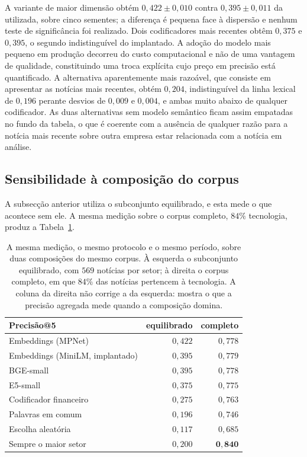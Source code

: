A variante de maior dimensão obtém $0{,}422 \pm 0{,}010$ contra $0{,}395 \pm 0{,}011$ da utilizada,
sobre cinco sementes; a diferença é pequena face à dispersão e nenhum teste de significância foi
realizado. Dois codificadores mais recentes obtêm $0{,}375$ e $0{,}395$, o segundo indistinguível do
implantado. A adoção do modelo
mais pequeno em produção decorreu do custo computacional e não de uma vantagem de qualidade,
constituindo uma troca explícita cujo preço em precisão está quantificado. A alternativa aparentemente mais
razoável, que consiste em apresentar as notícias mais recentes, obtém $0{,}204$, indistinguível da
linha lexical de $0{,}196$ perante desvios de $0{,}009$ e $0{,}004$, e ambas muito abaixo de
qualquer codificador. As duas alternativas sem modelo semântico ficam assim empatadas no fundo da
tabela, o que é coerente com a ausência de qualquer razão para a notícia mais recente sobre outra
empresa estar relacionada com a notícia em análise.

\subsection{Sensibilidade à composição do corpus}
\label{sec:av_composicao}

A subsecção anterior utiliza o subconjunto equilibrado, e esta mede o que acontece sem ele. A
mesma medição sobre o corpus completo, $84\%$ tecnologia, produz a
Tabela~\ref{tab:av_composicao}.

\begin{table}[htbp]
\centering
\small
\caption[A precisão agregada sob duas composições do mesmo corpus]{A mesma medição, o mesmo
protocolo e o mesmo período, sobre duas composições do mesmo corpus. À esquerda o subconjunto
equilibrado, com $569$ notícias por setor; à direita o corpus completo, em que $84\%$ das notícias
pertencem à tecnologia. A coluna da direita não corrige a da esquerda: mostra o que a precisão
agregada mede quando a composição domina.}
\label{tab:av_composicao}
\begin{tabular}{lrr}
\toprule
Precisão@5 & equilibrado & completo \\
\midrule
Embeddings (MPNet)             & $0{,}422$ & $0{,}778$ \\
Embeddings (MiniLM, implantado) & $0{,}395$ & $0{,}779$ \\
BGE-small                      & $0{,}395$ & $0{,}778$ \\
E5-small                       & $0{,}375$ & $0{,}775$ \\
Codificador financeiro         & $0{,}275$ & $0{,}763$ \\
Palavras em comum              & $0{,}196$ & $0{,}746$ \\
Escolha aleatória              & $0{,}117$ & $0{,}685$ \\
\midrule
Sempre o maior setor           & $0{,}200$ & $\mathbf{0{,}840}$ \\
\bottomrule
\end{tabular}
\end{table}


